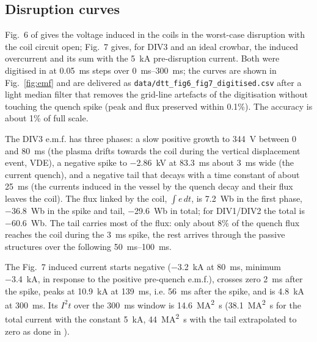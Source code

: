 \documentclass[11pt,a4paper]{article}
\newcommand{\code}[1]{\texttt{#1}}
\begin{document}
\subsection{Disruption curves}
Fig.~6 of \cite{enea_spec} gives the voltage induced in the coils in the worst-case disruption with the coil circuit open; Fig.~7 gives, for DIV3 and an ideal crowbar, the induced overcurrent and its sum with the \SI{5}{\kilo\ampere} pre-disruption current. Both were digitised in \cite{crowbar_note} at \SI{0.05}{\milli\second} steps over \SIrange{0}{300}{\milli\second}; the curves are shown in Fig.~\ref{fig:emf} and are delivered as \code{data/dtt\_fig6\_fig7\_digitised.csv} after a light median filter that removes the grid-line artefacts of the digitisation without touching the quench spike (peak and flux preserved within 0.1\%). The accuracy is about 1\% of full scale.

The DIV3 e.m.f. has three phases: a slow positive growth to \SI{+344}{\volt} between \SI{0}{} and \SI{80}{\milli\second} (the plasma drifts towards the coil during the vertical displacement event, VDE), a negative spike to \SI{-2.86}{\kilo\volt} at \SI{83.3}{\milli\second} about \SI{3}{\milli\second} wide (the current quench), and a negative tail that decays with a time constant of about \SI{25}{\milli\second} (the currents induced in the vessel by the quench decay and their flux leaves the coil). The flux linked by the coil, $\int e\,dt$, is \SI{+7.2}{\weber} in the first phase, \SI{-36.8}{\weber} in the spike and tail, \SI{-29.6}{\weber} in total; for DIV1/DIV2 the total is \SI{-60.6}{\weber}. The tail carries most of the flux: only about 8\% of the quench flux reaches the coil during the \SI{3}{\milli\second} spike, the rest arrives through the passive structures over the following \SIrange{50}{100}{\milli\second}.

The Fig.~7 induced current starts negative (\SI{-3.2}{\kilo\ampere} at \SI{80}{\milli\second}, minimum \SI{-3.4}{\kilo\ampere}, in response to the positive pre-quench e.m.f.), crosses zero \SI{2}{\milli\second} after the spike, peaks at \SI{10.9}{\kilo\ampere} at \SI{139}{\milli\second}, i.e. \SI{56}{\milli\second} after the spike, and is \SI{4.8}{\kilo\ampere} at \SI{300}{\milli\second}. Its $I^2t$ over the \SI{300}{\milli\second} window is \SI{14.6}{\mega\ampere\squared\second} (\SI{38.1}{\mega\ampere\squared\second} for the total current with the constant \SI{5}{\kilo\ampere}, \SI{44}{\mega\ampere\squared\second} with the tail extrapolated to zero as done in \cite{crowbar_note}).
\end{document}
